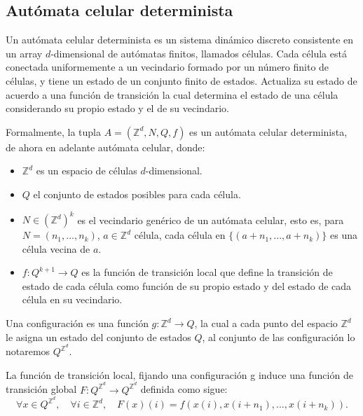 \documentclass[../proyecto.tex]{memoir}
\begin{document}
\subsection{Autómata celular determinista}
Un autómata celular determinista es un sistema dinámico discreto consistente en un array $d$-dimensional de autómatas finitos, llamados células. Cada célula está conectada uniformemente a un vecindario formado por un número finito de células, y tiene un estado de un conjunto finito de estados. Actualiza su estado de acuerdo a una función de transición la cual determina el estado de una célula considerando su propio estado y el de su vecindario. 

\begin{defi}
Formalmente, la tupla $A=(\mathds{Z}^{d}, N, Q, f)$ es un autómata celular determinista, de ahora en adelante autómata celular, donde:

\begin{itemize}
\item $\mathds{Z} ^{d}$ es un espacio de células $d$-dimensional.
\item $Q$ el conjunto de estados posibles para cada célula.
\item $N \in (\mathds{Z}^{d})^{k}$ es el vecindario genérico de un autómata celular, esto es, para $N=(n_{1},...,n_{k})$, $a \in \mathds{Z} ^{d}$ célula, cada célula en $\{(a+n_{1},...,a+n_{k})\}$ es una célula vecina de $a$.
\item $f:Q^{k+1} \rightarrow Q$ es la función de transición local que define la transición de estado de cada célula como función de su propio estado y del estado de cada célula en su vecindario. 
\end{itemize}

\end{defi}

\begin{defi}
Una configuración es una función $g: \mathds{Z}^{d} \rightarrow Q$, la cual a cada punto del espacio $\mathds{Z}^{d}$ le asigna un estado del conjunto de estados $Q$, al conjunto de las configuración lo notaremos $Q^{\mathds{Z}^{d}}$. 
\end{defi}

\begin{defi}
La función de transición local, fijando una configuración g induce una función de transición global $F:Q^{\mathds{Z}^{d}} \rightarrow Q^{\mathds{Z}^{d}}$ definida como sigue:
$$
\forall x \in Q^{\mathds{Z}^{d}}, \quad \forall i \in \mathds{Z}^{d}, \quad F(x)(i) = f(x(i),x(i+n_{1}),...,x(i+n_{k})).
$$
\end{defi}
\end{document}
